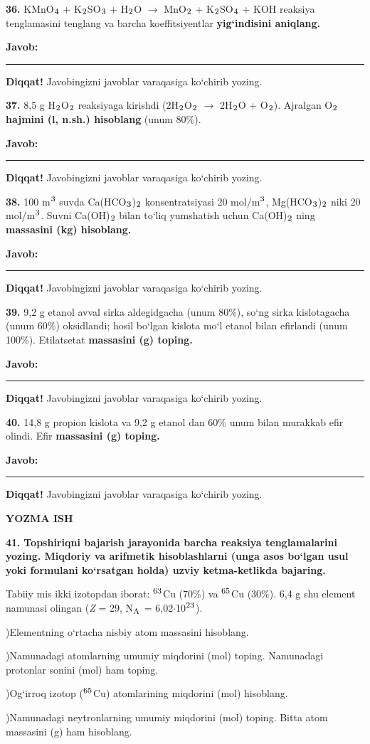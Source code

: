 \documentclass[11pt,a4paper]{article}
\renewcommand{\textsubscript}[1]{\ensuremath{_{\text{\fontsize{8}{8}\selectfont #1}}}}
\renewcommand{\textsuperscript}[1]{\ensuremath{^{\text{\fontsize{8}{8}\selectfont #1}}}}
\newcommand{\javob}{\par\smallskip\noindent\textbf{Javob:} \rule[-2pt]{7.5cm}{0.4pt}\par\smallskip\noindent\textbf{Diqqat!} Javobingizni javoblar varaqasiga ko`chirib yozing.\par\medskip}
\begin{document}
\par\bigskip
\noindent\textbf{36.} KMnO\textsubscript{4} + K\textsubscript{2}SO\textsubscript{3} + H\textsubscript{2}O $\to$ MnO\textsubscript{2} + K\textsubscript{2}SO\textsubscript{4} + KOH reaksiya tenglamasini tenglang va barcha koeffitsiyentlar \textbf{yig`indisini aniqlang.}
\javob
\noindent\textbf{37.} 8,5 g H\textsubscript{2}O\textsubscript{2} reaksiyaga kirishdi (2H\textsubscript{2}O\textsubscript{2} $\to$ 2H\textsubscript{2}O + O\textsubscript{2}). Ajralgan O\textsubscript{2} \textbf{hajmini (l, n.sh.) hisoblang} (unum 80\%).
\javob
\noindent\textbf{38.} 100 m\textsuperscript{3} suvda Ca(HCO\textsubscript{3})\textsubscript{2} konsentratsiyasi 20 mol/m\textsuperscript{3}, Mg(HCO\textsubscript{3})\textsubscript{2} niki 20 mol/m\textsuperscript{3}. Suvni Ca(OH)\textsubscript{2} bilan to`liq yumshatish uchun Ca(OH)\textsubscript{2} ning \textbf{massasini (kg) hisoblang.}
\javob
\noindent\textbf{39.} 9,2 g etanol avval sirka aldegidgacha (unum 80\%), so`ng sirka kislotagacha (unum 60\%) oksidlandi; hosil bo`lgan kislota mo`l etanol bilan efirlandi (unum 100\%). Etilatsetat \textbf{massasini (g) toping.}
\javob
\noindent\textbf{40.} 14,8 g propion kislota va 9,2 g etanol dan 60\% unum bilan murakkab efir olindi. Efir \textbf{massasini (g) toping.}
\javob
\par\bigskip\begin{center}\textbf{\fontsize{13}{15}\selectfont YOZMA ISH}\end{center}
\noindent\textbf{41.} \textbf{Topshiriqni bajarish jarayonida barcha reaksiya tenglamalarini yozing. Miqdoriy va arifmetik hisoblashlarni (unga asos bo`lgan usul yoki formulani ko`rsatgan holda) uzviy ketma-ketlikda bajaring.}\par\smallskip
Tabiiy mis ikki izotopdan iborat: \textsuperscript{63}Cu (70\%) va \textsuperscript{65}Cu (30\%). 6,4 g shu element namunasi olingan (\textit{Z} = 29, N\textsubscript{A} = 6,02$\cdot$10\textsuperscript{23}).\par
{})Elementning o`rtacha nisbiy atom massasini hisoblang.\par
{})Namunadagi atomlarning umumiy miqdorini (mol) toping. Namunadagi protonlar sonini (mol) ham toping.\par
{})Og`irroq izotop (\textsuperscript{65}Cu) atomlarining miqdorini (mol) hisoblang.\par
{})Namunadagi neytronlarning umumiy miqdorini (mol) toping. Bitta atom massasini (g) ham hisoblang.\par
\end{document}
